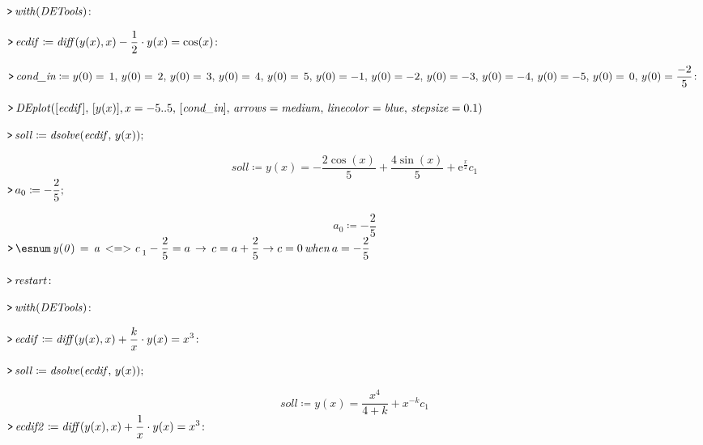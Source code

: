 \documentclass{article}
\begin{document}
\mapleinput
{$ \displaystyle \texttt{>\,} \mathit{with} (\mathit{DETools})\colon  $}

\mapleinput
{$ \displaystyle \texttt{>\,} \mathit{ecdif} \coloneqq \mathit{diff} (y (x),x)-\frac{1}{2}\cdot y (x)=\cos (x)\colon  $}

\mapleinput
{$ \displaystyle \texttt{>\,} \textit{cond\_in} \coloneqq y (0)=\,1,\,y (0)=\,2,\,y (0)=\,3,\,y (0)=\,4,\,y (0)=\,5,\,y (0)=-1,\,y (0)=-2,\,y (0)=-3,\,y (0)=-4,\,y (0)=-5,\,y (0)=\,0,\,y (0)=\frac{-2}{5}\colon  $}

\mapleinput
{$ \displaystyle \texttt{>\,} \mathit{DEplot} ([\mathit{ecdif}],\,[y (x)],x =-5..5,\,[\textit{cond\_in}],\,\mathit{arrows} =\mathit{medium} ,\,\mathit{linecolor} =\mathit{blue} ,\,\mathit{stepsize} = 0.1) $}

{}
\mapleinput
{$ \displaystyle \texttt{>\,} \mathit{soll} \coloneqq \mathit{dsolve} (\mathit{ecdif} ,\,y (x)); $}

\begin{dmath}\label{(26)}
\mathit{soll} \coloneqq y \! \left(x \right)=-\frac{2 \cos \! \left(x \right)}{5}+\frac{4 \sin \! \left(x \right)}{5}+{\mathrm e}^{\frac{x}{2}} c_{1}
\end{dmath}
\mapleinput
{$ \displaystyle \texttt{>\,} a_{0}\coloneqq -\frac{2}{5};\, $}

\begin{dmath}\label{(27)}
a_{0}\coloneqq -\frac{2}{5}
\end{dmath}
\mapleinput
{$ \displaystyle \texttt{>\,} \esnum \mathit{\,y(0)\,=\,a\,<=>c\,}_{1}-\frac{2}{5}=a \,\rightarrow \,c =a +\frac{2}{5}\rightarrow c =0\,\mathit{when} \,a =-\frac{2}{5} $}

\mapleinput
{$ \displaystyle \texttt{>\,} \mathit{restart} \colon 
\\
  $}

\mapleinput
{$ \displaystyle \texttt{>\,} \mathit{with} (\mathit{DETools})\colon  $}

\mapleinput
{$ \displaystyle \texttt{>\,} \mathit{ecdif} \coloneqq \mathit{diff} (y (x),x)+\frac{k}{x}\cdot y (x)=x^{3}\colon  $}

\mapleinput
{$ \displaystyle \texttt{>\,} \mathit{soll} \coloneqq \mathit{dsolve} (\mathit{ecdif} ,\,y (x)); $}

\begin{dmath}\label{(28)}
\mathit{soll} \coloneqq y \! \left(x \right)=\frac{x^{4}}{4+k}+x^{-k} c_{1}
\end{dmath}
\mapleinput
{$ \displaystyle \texttt{>\,} \mathit{ecdif2} \coloneqq \mathit{diff} (y (x),x)+\frac{1}{x}\cdot y (x)=x^{3}\colon  $}
\end{document}
